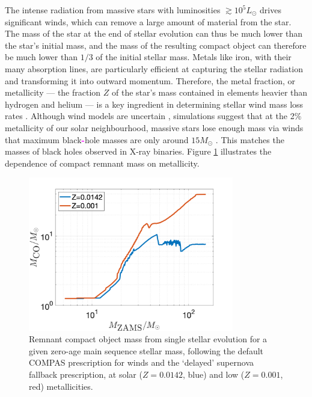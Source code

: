 \documentclass[review]{elsarticle}
\newcommand{\ilya}[1]{\textcolor{magenta}{\bf{#1}}}
\begin{document}
The intense radiation from massive stars with luminosities $\gtrsim 10^5 L_\odot$ drives significant winds, which can remove a large amount of material from the star. The mass of the star at the end of stellar evolution can thus be much lower than the star's initial mass, and the mass of the resulting compact object can therefore be much lower than $1/3$ of the initial stellar mass. Metals like iron, with their many absorption lines, are particularly efficient at capturing the stellar radiation and transforming it into outward momentum.  Therefore, the metal fraction, or metallicity  --- the fraction $Z$ of the star's mass contained in elements heavier than hydrogen and helium --- is a key ingredient in determining stellar wind mass loss rates \citep{Vink:2001}. Although wind models are uncertain \citep[e.g.,][]{Renzo:2017}, simulations suggest that at the 2\% metallicity of our solar neighbourhood, massive stars lose enough mass via winds that maximum black\ilya{-}hole masses are only around $15 M_\odot$ \citep{Belczynski:2009,Spera:2015}. This matches the masses of black holes observed in X-ray binaries. Figure \ref{fig:BHremnant} illustrates the dependence of compact remnant mass on metallicity. 
 
\begin{figure}
	\centering
	\includegraphics[width=0.8\textwidth]{BHremnantdelayed.png}
	\caption{\label{fig:BHremnant} Remnant compact object mass from single stellar evolution for a given zero-age main sequence stellar mass, following the default COMPAS prescription for winds \citep{COMPAS:2021}  and the `delayed' \citet{Fryer:2012} supernova fallback prescription, at solar  ($Z=0.0142$, blue) and low ($Z=0.001$, red) metallicities.  
	} 
\end{figure}
\end{document}
